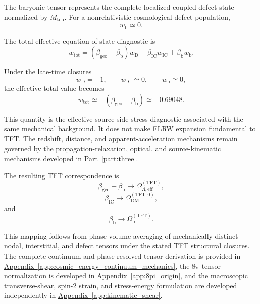 The baryonic tensor represents the complete localized coupled defect state normalized by $M_{\mathrm{top}}$. For a nonrelativistic cosmological defect population,
\begin{equation}
    w_{\mathrm{b}} \simeq 0.
\end{equation}

The total effective equation-of-state diagnostic is
\begin{equation}
    w_{\mathrm{tot}} = \left( \beta_{\mathrm{geo}} - \beta_{\mathrm{b}} \right)w_{\mathrm{D}} + \beta_{\mathrm{IC}}w_{\mathrm{IC}} + \beta_{\mathrm{b}}w_{\mathrm{b}}.
\end{equation}

Under the late-time closures
\begin{equation}
    w_{\mathrm{D}} = -1, \qquad w_{\mathrm{IC}} \simeq 0, \qquad w_{\mathrm{b}} \simeq 0,
\end{equation}
the effective total value becomes
\begin{equation}
    w_{\mathrm{tot}} \simeq - \left( \beta_{\mathrm{geo}} - \beta_{\mathrm{b}} \right) \simeq -0.69048.
\end{equation}

This quantity is the effective source-side stress diagnostic associated with the same mechanical background. It does not make FLRW expansion fundamental to TFT. The redshift, distance, and apparent-acceleration mechanisms remain governed by the propagation-relaxation, optical, and source-kinematic mechanisms developed in Part~\ref{part:three}.

The resulting TFT correspondence is
\begin{equation}
    \beta_{\mathrm{geo}} - \beta_{\mathrm{b}} \longrightarrow \Omega_{\Lambda,\mathrm{eff}}^{(\mathrm{TFT})},
\end{equation}
\begin{equation}
    \beta_{\mathrm{IC}} \longrightarrow \Omega_{\mathrm{DM}}^{(\mathrm{TFT},0)},
\end{equation}
and
\begin{equation}
    \beta_{\mathrm{b}} \longrightarrow \Omega_{\mathrm{b}}^{(\mathrm{TFT})}.
\end{equation}

This mapping follows from phase-volume averaging of mechanically distinct nodal, interstitial, and defect tensors under the stated TFT structural closures. The complete continuum and phase-resolved tensor derivation is provided in \hyperref[app:cosmic_energy_continuum_mechanics]{Appendix~\ref*{app:cosmic_energy_continuum_mechanics}}, the $8\pi$ tensor normalization is developed in \hyperref[app:8pi_origin]{Appendix~\ref*{app:8pi_origin}}, and the macroscopic transverse-shear, spin-2 strain, and stress-energy formulation are developed independently in \hyperref[app:kinematic_shear]{Appendix~\ref*{app:kinematic_shear}}.

